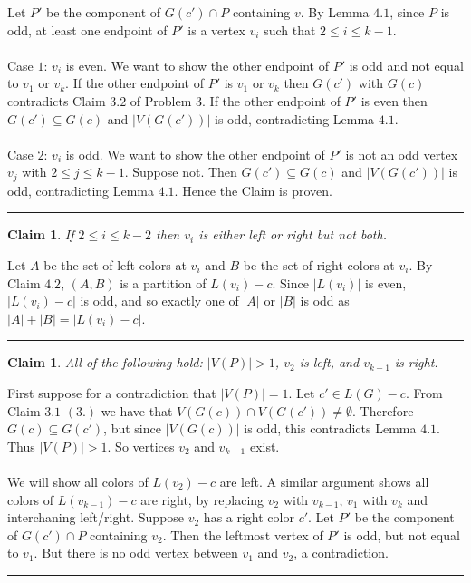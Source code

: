 \documentclass[letterpaper,12pt,oneside,onecolumn]{article}
\newenvironment{proof}{{\bf Proof:  }}{\hfill\rule{2mm}{2mm}}
\newtheorem{claim}[fact]{Claim}
\begin{document}
\begin{proof}
	Let $P'$ be the component of $G(c') \cap P$ containing $v$. By Lemma $4.1$, since $P$ is odd, at least one endpoint of $P'$ is a vertex $v_i$ such that $2\leq i\leq k-1$.
	\paragraph{}
	Case $1$: $v_i$ is even. We want to show the other endpoint of $P'$ is odd and not equal to $v_1$ or $v_k$. If the other endpoint of $P'$ is $v_1$ or $v_k$ then $G(c')$ with $G(c)$ contradicts Claim $3.2$ of Problem $3$.  If the other endpoint of $P'$ is even then $G(c') \subseteq G(c)$ and $|V(G(c'))|$ is odd, contradicting Lemma $4.1$.
	\paragraph{}
	Case $2$: $v_i$ is odd. We want to show the other endpoint of $P'$ is not an odd vertex $v_j$ with $2\leq j \leq k-1$. Suppose not. Then $G(c') \subseteq G(c)$ and $|V(G(c'))|$ is odd, contradicting Lemma $4.1$. Hence the Claim is proven.
\end{proof}
\begin{claim}
	If $2\leq i \leq k-2$ then $v_i$ is either left or right but not both.
\end{claim}
\begin{proof}
	Let $A$ be the set of left colors at $v_i$ and $B$ be the set of right colors at $v_i$. By Claim $4.2$, $(A,B)$ is a partition of $L(v_i) - c$. Since $|L(v_i)|$ is even, $|L(v_i)-c|$ is odd, and so exactly one of $|A|$ or $|B|$ is odd as $|A| + |B| = |L(v_i)-c|$.
\end{proof}
\begin{claim}
	All of the following hold: $|V(P)| > 1$, $v_2$ is left, and $v_{k-1}$ is right.
\end{claim}
\begin{proof}
	First suppose for a contradiction that $|V(P)| = 1$. Let $c' \in L(G) -c$. From Claim $3.1$ $(3.)$ we have that $V(G(c)) \cap V(G(c')) \neq \emptyset$. Therefore $G(c) \subseteq G(c')$, but since $|V(G(c))|$ is odd, this contradicts Lemma $4.1$. Thus $|V(P)| > 1$. So vertices $v_2$ and $v_{k-1}$ exist.
	\paragraph{}
	We will show all colors of $L(v_2) - c$ are left. A similar argument shows all colors of $L(v_{k-1})-c$ are right, by replacing $v_2$ with $v_{k-1}$, $v_1$ with $v_k$ and interchaning left/right. Suppose $v_2$ has a right color $c'$. Let $P'$ be the component of $G(c') \cap P$ containing $v_2$. Then the leftmost vertex of $P'$ is odd, but not equal to $v_1$. But there is no odd vertex between $v_1$ and $v_2$, a contradiction.
\end{proof}
\end{document}
